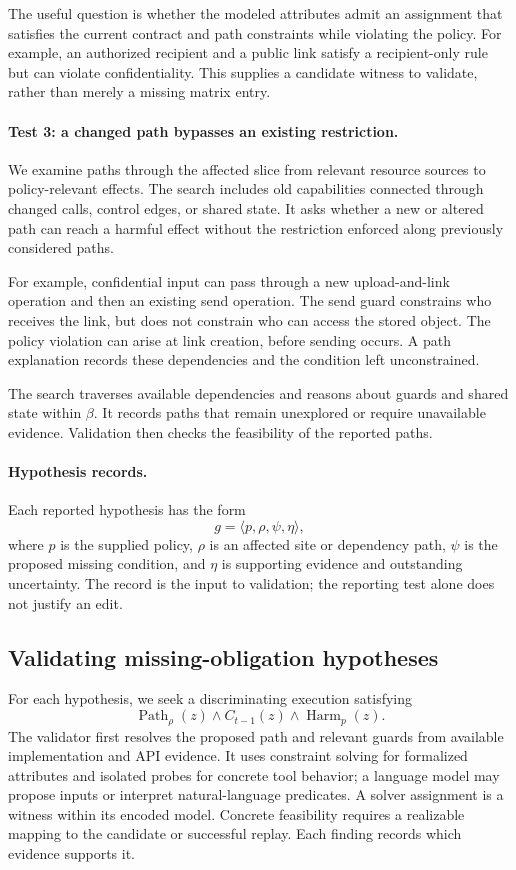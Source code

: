 The useful question is whether the modeled attributes admit an assignment
that satisfies the current contract and path constraints while violating
the policy. For example, an authorized recipient and a public link satisfy
a recipient-only rule but can violate confidentiality. This supplies a
candidate witness to validate, rather than merely a missing matrix entry.

\paragraph{Test 3: a changed path bypasses an existing restriction.}
We examine paths through the affected slice from relevant resource sources
to policy-relevant effects. The search includes old capabilities connected
through changed calls, control edges, or shared state. It asks whether a new
or altered path can reach a harmful effect without the restriction enforced
along previously considered paths.

For example, confidential input can pass through a new upload-and-link
operation and then an existing send operation. The send guard constrains who
receives the link, but does not constrain who can access the stored object.
The policy violation can arise at link creation, before sending occurs.
A path explanation records these dependencies and the condition left
unconstrained.

The search traverses available dependencies and reasons about guards and shared state within \(\beta\). It records paths that remain unexplored or require unavailable evidence. Validation then checks the feasibility of the reported paths.

\paragraph{Hypothesis records.}
Each reported hypothesis has the form
\[
 g=\langle p,\rho,\psi,\eta\rangle,
\]
where \(p\) is the supplied policy, \(\rho\) is an affected site or dependency
path, \(\psi\) is the proposed missing condition, and \(\eta\) is supporting
evidence and outstanding uncertainty. The record is the input to validation; the reporting test alone does not justify an edit.

\subsection{Validating missing-obligation hypotheses}
\label{sec:validate}

For each hypothesis, we seek a discriminating execution satisfying
\[
 \operatorname{Path}_{\rho}(z)
 \land C_{t-1}(z)
 \land\operatorname{Harm}_{p}(z).
\]
The validator first resolves the proposed path and relevant guards from available implementation and API evidence. It uses constraint solving for formalized attributes and isolated probes for concrete tool behavior; a language model may propose inputs or interpret natural-language predicates. A solver assignment is a witness within its encoded model. Concrete feasibility requires a realizable mapping to the candidate or successful replay. Each finding records which evidence supports it.

